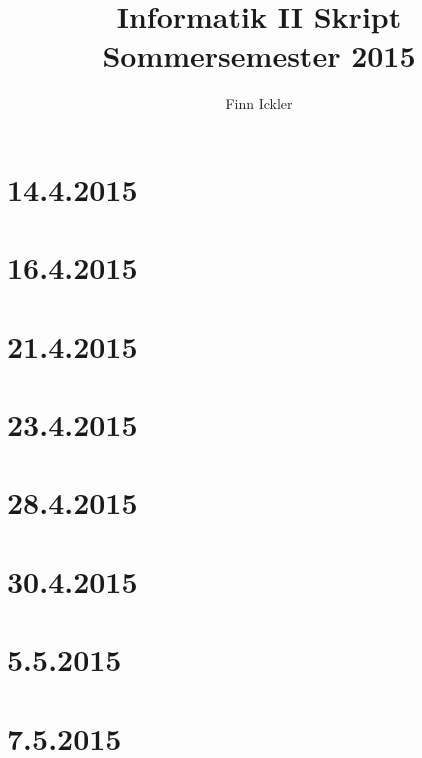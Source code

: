 \documentclass[a4paper,12pt]{scrartcl}
\author{Finn Ickler}
\title{Informatik II Skript Sommersemester 2015}
\begin{document}
\maketitle
\tableofcontents
\newpage
\section{14.4.2015}

\section{16.4.2015}

\section{21.4.2015}

\section{23.4.2015}

\section{28.4.2015}

\section{30.4.2015}

\section{5.5.2015}
\newpage
\section{7.5.2015}

\end{document}
